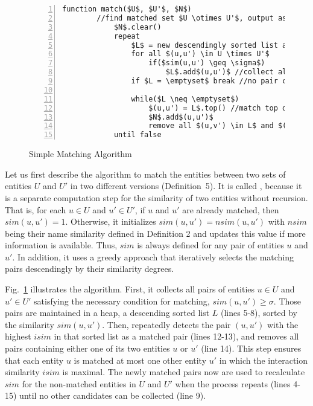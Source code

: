 \begin{figure}
\begin{lstlisting}[stepnumber=1,numbers=left,numbersep=-5pt]
		function match($U$, $U'$, $N$)
		//find matched set $U \otimes U'$, output as a map $N$
			$N$.clear()
			repeat
				$L$ = new descendingly sorted list associating with $sim$
				for all $(u,u') \in U \times U'$
					if($sim(u,u') \geq \sigma$)
						$L$.add$(u,u')$ //collect all pairs of candidates
				if $L = \emptyset$ break //no pair collected => done
		
				while($L \neq \emptyset$)
					$(u,u') = L$.top() //match top ones
					$N$.add$(u,u')$
					remove all $(u,v') \in L$ and $(v,u') \in L$ //remove their pairs
			until false
\end{lstlisting}
\caption{Simple Matching Algorithm}
\label{cmatching}
\end{figure}

Let us first describe the algorithm to match the entities between two
sets of entities $U$ and $U'$ in two different versions
(Definition~5). It is called , because it
is a separate computation step for
the similarity of two entities without recursion. That is, for each $u
\in U$ and $u' \in U'$, if $u$ and $u'$ are already matched, then
$sim(u,u') = 1$. Otherwise, it initializes $sim(u,u')=nsim(u,u')$ with
$nsim$ being their name similarity defined in Definition 2 and updates
this value if more information is available. Thus, $sim$ is always
defined for any pair of entities $u$ and $u'$. In addition, it uses a
greedy approach that iteratively selects the matching pairs
descendingly by their similarity degrees.


Fig.~\ref{cmatching} illustrates the algorithm. First, it
collects all pairs of entities $u \in U$ and $u' \in U'$ satisfying
the necessary condition for matching, \ie$sim(u,u') \ge
\sigma$. Those pairs are maintained in a heap, \ie a descending
sorted list $L$ (lines 5-8), sorted by the similarity
$sim(u,u')$. Then, {\tool} repeatedly detects the pair $(u,u')$ with
the highest $isim$ in that sorted list as a matched pair (lines
12-13), and removes all pairs containing either one of its two
entities $u$ or $u'$ (line 14). This step ensures that each entity $u$
is matched at most one other entity $u'$ in which the interaction
similarity $isim$ is maximal. The newly matched pairs now are used
to recalculate $sim$ for the non-matched entities in $U$ and $U'$
when the process repeats (lines 4-15) until no other candidates
can be collected (line 9).

